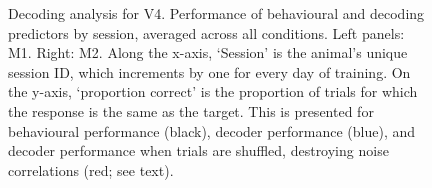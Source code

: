 \begin{figure}[htbp]
    \centering
    \hspace*{\fill}
    \hspace*{\fill}\hspace{.2cm}\hspace*{\fill}
    \hspace*{\fill}
    \caption{%
    Decoding analysis for \ac{V4}.
    Performance of behavioural and decoding predictors by session, averaged across all conditions.
    Left panels: \ac{M1}. Right: \ac{M2}.
	Along the x-axis, `Session' is the animal's unique session ID, which increments by one for every day of training.
    On the y-axis, `proportion correct' is the proportion of trials for which the response is the same as the target.
    This is presented for behavioural performance (black), decoder performance (blue), and decoder performance when trials are shuffled, destroying noise correlations (red; see text).
}
    \label{fig:dec_all_v4}
\end{figure}


